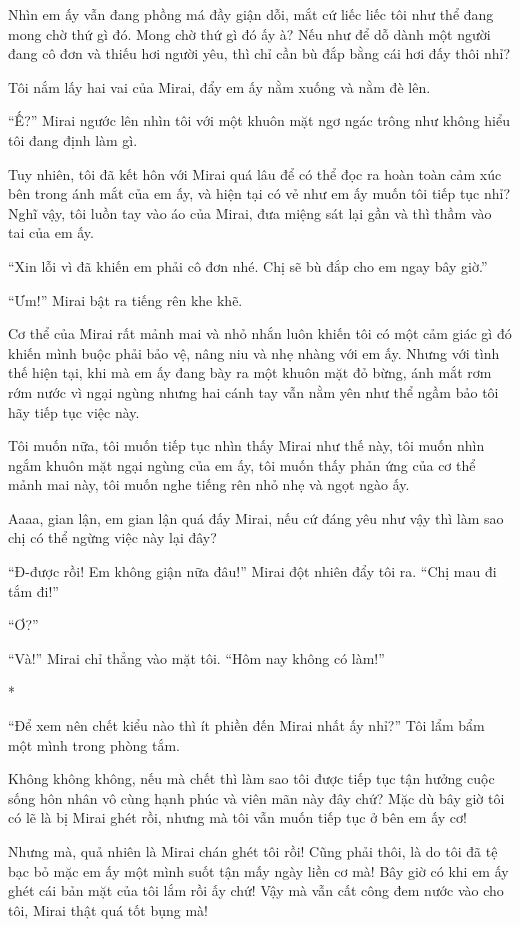 {Nhìn em ấy vẫn đang phồng má đầy giận dỗi, mắt cứ liếc liếc tôi như thể
đang mong chờ thứ gì đó. Mong chờ thứ gì đó ấy à? Nếu như để dỗ dành một
người đang cô đơn và thiếu hơi người yêu, thì chỉ cần bù đắp bằng cái
hơi đấy thôi nhỉ?

Tôi nắm lấy hai vai của Mirai, đẩy em ấy nằm xuống và nằm đè lên.

``Ế?'' Mirai ngước lên nhìn tôi với một khuôn mặt ngơ ngác trông như
không hiểu tôi đang định làm gì.

Tuy nhiên, tôi đã kết hôn với Mirai quá lâu để có thể đọc ra hoàn toàn
cảm xúc bên trong ánh mắt của em ấy, và hiện tại có vẻ như em ấy muốn
tôi tiếp tục nhỉ? Nghĩ vậy, tôi luồn tay vào áo của Mirai, đưa miệng sát
lại gần và thì thầm vào tai của em ấy.

``Xin lỗi vì đã khiến em phải cô đơn nhé. Chị sẽ bù đắp cho em ngay bây
giờ.''

``Ưm!'' Mirai bật ra tiếng rên khe khẽ.

Cơ thể của Mirai rất mảnh mai và nhỏ nhắn luôn khiến tôi có một cảm giác
gì đó khiến mình buộc phải bảo vệ, nâng niu và nhẹ nhàng với em ấy.
Nhưng với tình thế hiện tại, khi mà em ấy đang bày ra một khuôn mặt đỏ
bừng, ánh mắt rơm rớm nước vì ngại ngùng nhưng hai cánh tay vẫn nằm yên
như thể ngầm bảo tôi hãy tiếp tục việc này.

Tôi muốn nữa, tôi muốn tiếp tục nhìn thấy Mirai như thế này, tôi muốn
nhìn ngắm khuôn mặt ngại ngùng của em ấy, tôi muốn thấy phản ứng của cơ
thể mảnh mai này, tôi muốn nghe tiếng rên nhỏ nhẹ và ngọt ngào ấy.

Aaaa, gian lận, em gian lận quá đấy Mirai, nếu cứ đáng yêu như vậy thì
làm sao chị có thể ngừng việc này lại đây?

``Đ-được rồi! Em không giận nữa đâu!'' Mirai đột nhiên đẩy tôi ra. ``Chị
mau đi tắm đi!''

``Ơ?''

``Và!'' Mirai chỉ thẳng vào mặt tôi. ``Hôm nay không có làm!''

*

``Để xem nên chết kiểu nào thì ít phiền đến Mirai nhất ấy nhỉ?'' Tôi lẩm
bẩm một mình trong phòng tắm.

Không không không, nếu mà chết thì làm sao tôi được tiếp tục tận hưởng
cuộc sống hôn nhân vô cùng hạnh phúc và viên mãn này đây chứ? Mặc dù bây
giờ tôi có lẽ là bị Mirai ghét rồi, nhưng mà tôi vẫn muốn tiếp tục ở bên
em ấy cơ!

Nhưng mà, quả nhiên là Mirai chán ghét tôi rồi! Cũng phải thôi, là do
tôi đã tệ bạc bỏ mặc em ấy một mình suốt tận mấy ngày liền cơ mà! Bây
giờ có khi em ấy ghét cái bản mặt của tôi lắm rồi ấy chứ! Vậy mà vẫn cất
công đem nước vào cho tôi, Mirai thật quá tốt bụng mà!

}
